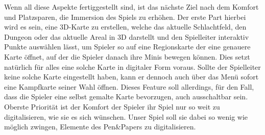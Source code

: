 Wenn all diese Aspekte fertiggestellt sind, ist das nächste Ziel nach dem Komfort und Platzsparen, die Immersion des
Spiels zu erhöhen.\newline
Der erste Part hierbei wird es sein, eine 3D-Karte zu erstellen, welche das aktuelle Schlachtfeld, den Dungeon oder
das aktuelle Areal in 3D darstellt und den Spielleiter interaktiv Punkte auswählen lässt, um Spieler so auf eine
Regionskarte der eine genauere Karte öffnet, auf der die Spieler danach ihre Minis bewegen können.
Dies setzt natürlich für alles eine solche Karte in digitaler Form voraus.
Sollte der Spielleiter keine solche Karte eingestellt haben, kann er dennoch auch über das Menü sofort
eine Kampfkarte seiner Wahl öffnen.
Dieses Feature soll allerdings, für den Fall, dass die Spieler eine selbst gemalte Karte bevorzugen, auch
ausschaltbar sein.
Oberste Priorität ist der Komfort der Spieler ihr Spiel nur so weit zu digitalisieren, wie sie es sich wünschen.
Unser Spiel soll sie dabei so wenig wie möglich zwingen, Elemente des Pen\&Papers zu digitalisieren.\n
